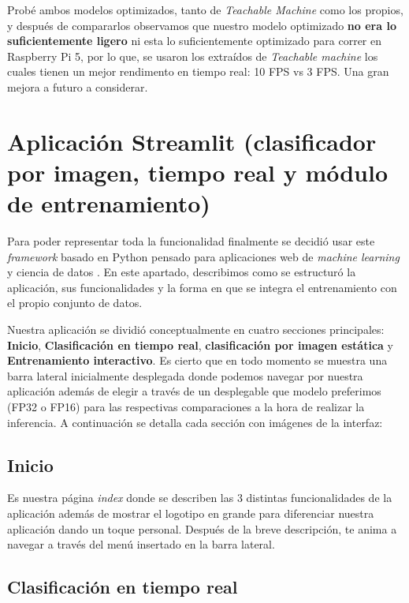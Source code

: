 Probé ambos modelos optimizados, tanto de \textit{Teachable Machine} como los propios, y después de compararlos observamos que nuestro modelo optimizado \textbf{no era lo suficientemente ligero} ni esta lo suficientemente optimizado para correr en Raspberry Pi 5, por lo que, se usaron los extraídos de \textit{Teachable machine} los cuales tienen un mejor rendimento en tiempo real: 10 FPS vs 3 FPS. Una gran mejora a futuro a considerar.


\section{Aplicación Streamlit (clasificador por imagen, tiempo real y módulo de entrenamiento)}


Para poder representar toda la funcionalidad finalmente se decidió usar este \textit{framework} basado en Python pensado para aplicaciones web de \textit{machine learning} y ciencia de datos \cite{web:streamlit}. En este apartado, describimos como se estructuró la aplicación, sus funcionalidades y la forma en que se integra el entrenamiento con el propio conjunto de datos.

Nuestra aplicación se dividió conceptualmente en cuatro secciones principales: \textbf{Inicio}, \textbf{Clasificación en tiempo real}, \textbf{clasificación por imagen estática} y \textbf{Entrenamiento interactivo}. Es cierto que en todo momento se muestra una barra lateral inicialmente desplegada donde podemos navegar por nuestra aplicación además de elegir a través de un desplegable que modelo preferimos (FP32 o FP16) para las respectivas comparaciones a la hora de realizar la inferencia. A continuación se detalla cada sección con imágenes de la interfaz:

\subsection{\textbf{Inicio}}

Es nuestra página \textit{index} donde se describen las 3 distintas funcionalidades de la aplicación además de mostrar el logotipo en grande para diferenciar nuestra aplicación dando un toque personal. Después de la breve descripción, te anima a navegar a través del menú insertado en la barra lateral.


\subsection{\textbf{Clasificación en tiempo real}}

